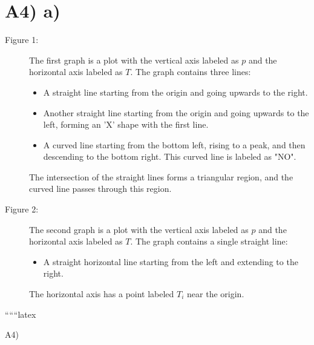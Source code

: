 \section*{A4) a)}

\begin{description}
    \item[Figure 1:] The first graph is a plot with the vertical axis labeled as \( p \) and the horizontal axis labeled as \( T \). The graph contains three lines:
    \begin{itemize}
        \item A straight line starting from the origin and going upwards to the right.
        \item Another straight line starting from the origin and going upwards to the left, forming an 'X' shape with the first line.
        \item A curved line starting from the bottom left, rising to a peak, and then descending to the bottom right. This curved line is labeled as "NO".
    \end{itemize}
    The intersection of the straight lines forms a triangular region, and the curved line passes through this region.
    
    \item[Figure 2:] The second graph is a plot with the vertical axis labeled as \( p \) and the horizontal axis labeled as \( T \). The graph contains a single straight line:
    \begin{itemize}
        \item A straight horizontal line starting from the left and extending to the right.
    \end{itemize}
    The horizontal axis has a point labeled \( T_i \) near the origin.
\end{description}

``````latex


A4)